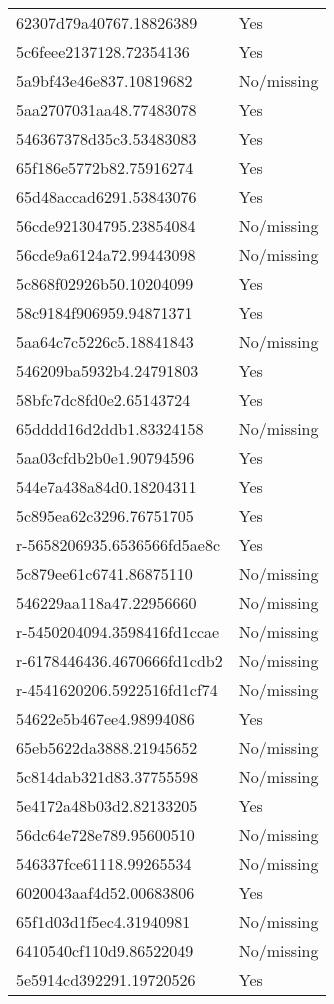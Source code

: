 \begin{tabular}{ll}
62307d79a40767.18826389 & Yes \\
5c6feee2137128.72354136 & Yes \\
5a9bf43e46e837.10819682 & No/missing \\
5aa2707031aa48.77483078 & Yes \\
546367378d35c3.53483083 & Yes \\
65f186e5772b82.75916274 & Yes \\
65d48accad6291.53843076 & Yes \\
56cde921304795.23854084 & No/missing \\
56cde9a6124a72.99443098 & No/missing \\
5c868f02926b50.10204099 & Yes \\
58c9184f906959.94871371 & Yes \\
5aa64c7c5226c5.18841843 & No/missing \\
546209ba5932b4.24791803 & Yes \\
58bfc7dc8fd0e2.65143724 & Yes \\
65dddd16d2ddb1.83324158 & No/missing \\
5aa03cfdb2b0e1.90794596 & Yes \\
544e7a438a84d0.18204311 & Yes \\
5c895ea62c3296.76751705 & Yes \\
r-5658206935.6536566fd5ae8c & Yes \\
5c879ee61c6741.86875110 & No/missing \\
546229aa118a47.22956660 & No/missing \\
r-5450204094.3598416fd1ccae & No/missing \\
r-6178446436.4670666fd1cdb2 & No/missing \\
r-4541620206.5922516fd1cf74 & No/missing \\
54622e5b467ee4.98994086 & Yes \\
65eb5622da3888.21945652 & No/missing \\
5c814dab321d83.37755598 & No/missing \\
5e4172a48b03d2.82133205 & Yes \\
56dc64e728e789.95600510 & No/missing \\
546337fce61118.99265534 & No/missing \\
6020043aaf4d52.00683806 & Yes \\
65f1d03d1f5ec4.31940981 & No/missing \\
6410540cf110d9.86522049 & No/missing \\
5e5914cd392291.19720526 & Yes \\

\end{tabular}
